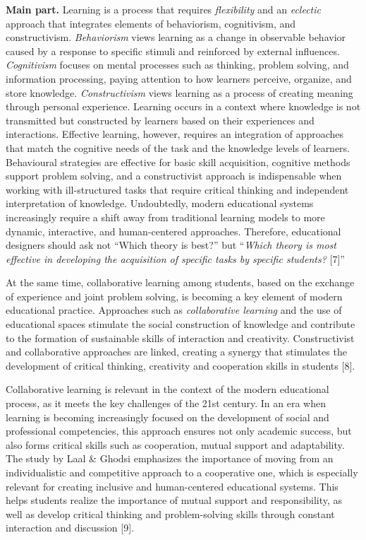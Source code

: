 {\bfseries Main part.} Learning is a process that requires
\emph{flexibility} and an \emph{eclectic} approach that integrates
elements of behaviorism, cognitivism, and constructivism.
\emph{Behaviorism} views learning as a change in observable behavior
caused by a response to specific stimuli and reinforced by external
influences. \emph{Cognitivism} focuses on mental processes such as
thinking, problem solving, and information processing, paying attention
to how learners perceive, organize, and store knowledge.
\emph{Constructivism} views learning as a process of creating meaning
through personal experience. Learning occurs in a context where
knowledge is not transmitted but constructed by learners based on their
experiences and interactions. Effective learning, however, requires an
integration of approaches that match the cognitive needs of the task and
the knowledge levels of learners. Behavioural strategies are effective
for basic skill acquisition, cognitive methods support problem solving,
and a constructivist approach is indispensable when working with
ill-structured tasks that require critical thinking and independent
interpretation of knowledge. Undoubtedly, modern educational systems
increasingly require a shift away from traditional learning models to
more dynamic, interactive, and human-centered approaches. Therefore,
educational designers should ask not ``Which theory is best?'' but
``\emph{Which theory is most effective in developing the acquisition of
specific tasks by specific students?} {[}7{]}''

At the same time, collaborative learning among students, based on the
exchange of experience and joint problem solving, is becoming a key
element of modern educational practice. Approaches such as
\emph{collaborative learning} and the use of educational spaces
stimulate the social construction of knowledge and contribute to the
formation of sustainable skills of interaction and creativity.
Constructivist and collaborative approaches are linked, creating a
synergy that stimulates the development of critical thinking, creativity
and cooperation skills in students {[}8{]}.

Collaborative learning is relevant in the context of the modern
educational process, as it meets the key challenges of the 21st century.
In an era when learning is becoming increasingly focused on the
development of social and professional competencies, this approach
ensures not only academic success, but also forms critical skills such
as cooperation, mutual support and adaptability. The study by Laal \&
Ghodsi emphasizes the importance of moving from an individualistic and
competitive approach to a cooperative one, which is especially relevant
for creating inclusive and human-centered educational systems. This
helps students realize the importance of mutual support and
responsibility, as well as develop critical thinking and problem-solving
skills through constant interaction and discussion {[}9{]}.

